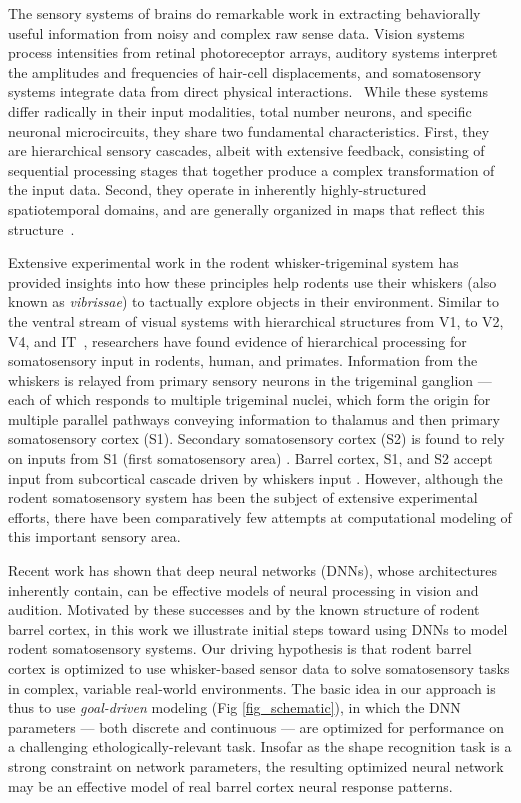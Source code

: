 The sensory systems of brains do remarkable work in extracting behaviorally useful information from noisy and complex raw sense data. 
Vision systems process intensities from retinal photoreceptor arrays, auditory systems interpret the amplitudes and frequencies of hair-cell displacements, and somatosensory systems integrate data from direct physical interactions.~\cite{purves2001neuroscience} 
While these systems differ radically in their input modalities, total number neurons, and specific neuronal microcircuits, they share two fundamental characteristics. 
First, they are hierarchical sensory cascades, albeit with extensive feedback, consisting of sequential processing stages that together produce a complex transformation of the input data.  
Second, they operate in inherently highly-structured spatiotemporal domains, and are generally organized in maps that reflect this structure~\cite{felleman1991distributed}.

Extensive experimental work in the rodent whisker-trigeminal system has provided insights into how these principles help rodents use their whiskers (also known as \emph{vibrissae}) to tactually explore objects in their environment.  
Similar to the ventral stream of visual systems with hierarchical structures from V1, to V2, V4, and IT~\cite{felleman1991distributed, Goodale1992, Diamond2008, yu, moore, dosman, bensmaia}, researchers have found evidence of hierarchical processing for somatosensory input in rodents, human, and primates\cite{Pons1987, Inui2004, Iwamura1998}. 
Information from the whiskers is relayed from primary sensory neurons in the trigeminal ganglion --- each of which responds to multiple trigeminal nuclei, which form the origin for multiple parallel pathways conveying information to thalamus and then primary somatosensory cortex (S1).
Secondary somatosensory cortex (S2) is found to rely on inputs from S1 (first somatosensory area) \cite{Pons1987, Petersen2007}. 
Barrel cortex, S1, and S2 accept input from subcortical cascade driven by  whiskers input \cite{Diamond2008}. 
However, although the rodent somatosensory system has been the subject of extensive experimental efforts, there have been comparatively few attempts at computational modeling of this important sensory area. 

Recent work has shown that deep neural networks (DNNs), whose architectures inherently contain, can be effective models of neural processing in vision\cite{} and audition\cite{}.
Motivated by these successes and by the known structure of rodent barrel cortex, in this work we illustrate initial steps toward using DNNs to model rodent somatosensory systems.
Our driving hypothesis is that rodent barrel cortex is optimized to use whisker-based sensor data to solve somatosensory tasks in complex, variable real-world environments. 
The basic idea in our approach is thus to use \emph{goal-driven} modeling (Fig \ref{fig_schematic}), in which the DNN parameters --- both discrete and continuous --- are optimized for performance on a challenging ethologically-relevant task\cite{}.  
Insofar as the shape recognition task is a strong constraint on network parameters, the resulting optimized neural network may be an effective model of real barrel cortex neural response patterns. 
 
